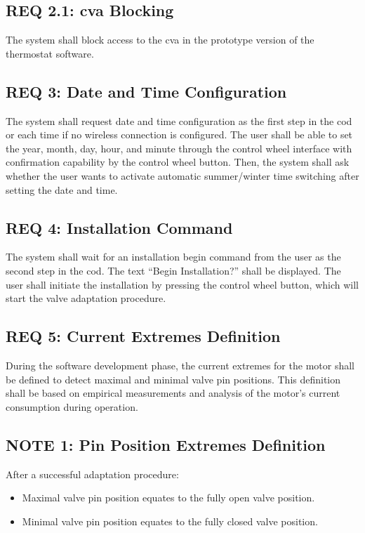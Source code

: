 \subsection*{REQ 2.1: \acs{cva} Blocking}
\label{subsec:REQ 2.1: CVA Blocking}
The system shall block access to the \acs{cva} in the prototype version of the thermostat software.

\subsection*{REQ 3: Date and Time Configuration}
\label{subsec:REQ 3: Date and Time Configuration}
The system shall request date and time configuration as the first step in the \acs{cod} or each time if no wireless connection is configured. The user shall be able to set the year, month, day, hour, and minute through the control wheel interface with confirmation capability by the control wheel button. Then, the system shall ask whether the user wants to activate automatic summer/winter time switching after setting the date and time.

\subsection*{REQ 4: Installation Command}
\label{subsec:REQ 4: Installation Command}
The system shall wait for an installation begin command from the user as the second step in the \acs{cod}. The text ``Begin Installation?'' shall be displayed. The user shall initiate the installation by pressing the control wheel button, which will start the valve adaptation procedure.

\subsection*{REQ 5: Current Extremes Definition}
\label{subsec:REQ 5: Current Extremes Definition}
During the software development phase, the current extremes for the motor shall be defined to detect maximal and minimal valve pin positions. This definition shall be based on empirical measurements and analysis of the motor's current consumption during operation.

\subsection*{NOTE 1: Pin Position Extremes Definition}
\label{subsec:NOTE 1: Pin Position Extremes Definition}
After a successful adaptation procedure:
\begin{itemize}
    \item Maximal valve pin position equates to the fully open valve position.
    \item Minimal valve pin position equates to the fully closed valve position.
\end{itemize}

